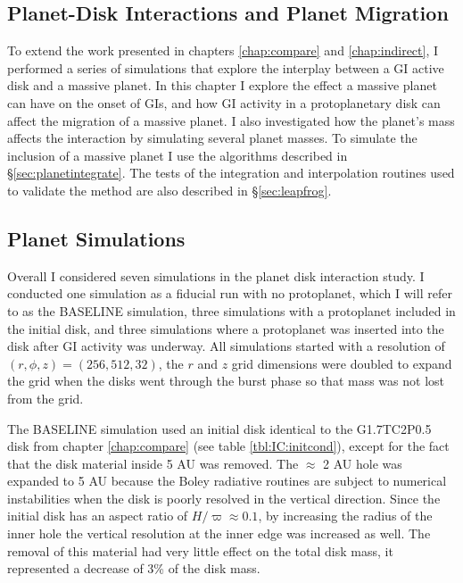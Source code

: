 \begin{spacing}{1.0}
\chapter[Planet Migration]{Planet-Disk Interactions and Planet Migration}\label{chap:planet}
\end{spacing}
\thispagestyle{plain}
To  extend the work presented in chapters \ref{chap:compare} and \ref{chap:indirect}, I performed a series of simulations that explore the interplay between a GI active disk and a massive planet. In this chapter I explore the effect a massive planet can have on the onset of GIs, and how GI activity in a protoplanetary disk can affect the migration of a massive planet. I also investigated how the planet's mass affects the interaction by simulating several planet masses. To simulate the inclusion of a massive planet I use the algorithms described in \S\ref{sec:planetintegrate}. The tests of the integration and interpolation routines used to validate the method are also described in \S\ref{sec:leapfrog}.

\section{Planet Simulations}\label{sec:PL:sims}

Overall I considered seven simulations in the planet disk interaction study. I conducted one simulation as a fiducial run with no protoplanet, which I will refer to as the BASELINE simulation, three simulations with a protoplanet included in the initial disk, and three simulations where a protoplanet was inserted into the disk after GI activity was underway. All simulations started with a resolution of $(r,\phi,z) = (256,512,32)$, the $r$ and $z$ grid dimensions were doubled to expand the grid when the disks went through the burst phase so that mass was not lost from the grid.

The BASELINE simulation used an initial disk identical to the G1.7TC2P0.5 disk from chapter \ref{chap:compare} (see table \ref{tbl:IC:initcond}), except for the fact that the disk material inside 5 AU was removed. The $\approx$ 2 AU hole was expanded to 5 AU because the Boley radiative routines are subject to numerical instabilities when the disk is poorly resolved in the vertical direction. Since the initial disk has an aspect ratio of $H/\varpi \approx 0.1$, by increasing the radius of the inner hole the vertical resolution at the inner edge was increased as well. The removal of this material had very little effect on the total disk mass, it represented a decrease of 3\% of the disk mass. 

